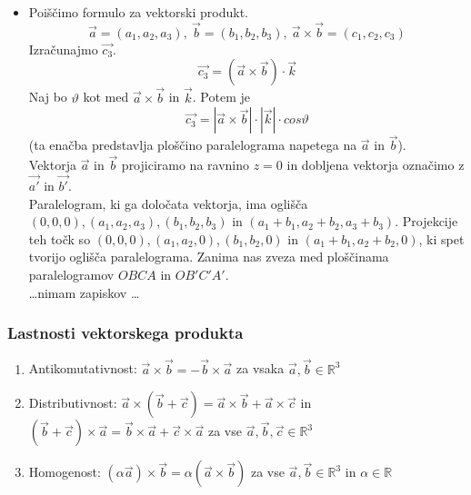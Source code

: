 \documentclass[a4paper,12pt]{article}
\begin{document}
\begin{itemize}
\item Poiščimo formulo za vektorski produkt.
$$ \vec{a} = (a_1, a_2, a_3), ~ \vec{b} = (b_1, b_2, b_3), ~ \vec{a} \times \vec{b} = (c_1, c_2, c_3)$$
Izračunajmo $ \vec{c_3} $.
$$ \vec{c_3} = (\vec{a} \times \vec{b}) \cdot \vec{k} $$
Naj bo $\vartheta$ kot med $\vec{a} \times \vec{b}$ in $\vec{k}$. Potem je 
$$ \vec{c_3} = | \vec{a} \times \vec{b} | \cdot |\vec{k}| \cdot cos\vartheta $$
(ta enačba predstavlja ploščino paralelograma napetega na $\vec{a}$ in $\vec{b}$).\\

Vektorja $\vec{a}$ in $ \vec{b}$ projiciramo na ravnino $z=0$ in dobljena vektorja označimo z $\vec{a'}$ in $\vec{b'}$.\\

Paralelogram, ki ga določata vektorja, ima oglišča $(0,0,0), (a_1, a_2, a_3), (b_1, b_2, b_3)$ in $ (a_1 + b_1, a_2 + b_2, a_3 + b_3)$. Projekcije teh točk so $(0,0,0), (a_1, a_2, 0), (b_1, b_2, 0)$ in $ (a_1 + b_1, a_2 + b_2, 0)$, ki spet tvorijo oglišča paralelograma. Zanima nas zveza med ploščinama paralelogramov $OBCA$ in $OB'C'A'$. \\

\ldots nimam zapiskov \ldots 
\end{itemize}

\newpage

\begin{center}
\subsubsection{Lastnosti vektorskega produkta}
\end{center}

\begin{enumerate}
\item Antikomutativnost: $ \vec{a} \times \vec{b} = - \vec{b} \times \vec{a}$ za vsaka $\vec{a}, \vec{b} \in \mathbb{R}^3$
\item Distributivnost: $ \vec{a} \times (\vec{b} + \vec{c}) = \vec{a} \times \vec{b} + \vec{a} \times \vec{c}$ in $(\vec{b} + \vec{c}) \times \vec{a} = \vec{b} \times \vec{a} + \vec{c} \times \vec{a}$ za vse $ \vec{a}, \vec{b}, \vec{c} \in \mathbb{R}^3$
\item Homogenost: $(\alpha \vec{a}) \times \vec{b} = \alpha ( \vec{a} \times \vec{b}) $ za vse $\vec{a}, \vec{b} \in \mathbb{R}^3$ in $\alpha \in \mathbb{R}$
\end{enumerate}
\end{document}
